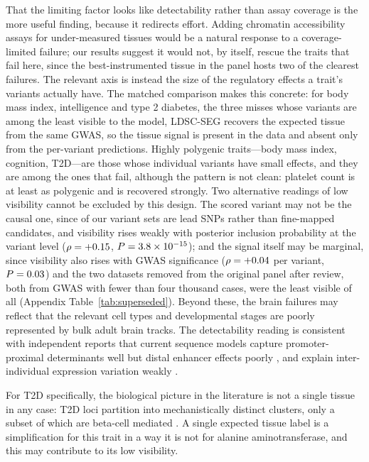 \documentclass[11pt]{article}
\begin{document}
That the limiting factor looks like detectability rather than assay coverage is the more
useful finding, because it redirects effort. Adding chromatin accessibility assays for
under-measured tissues would be a natural response to a coverage-limited failure; our
results suggest it would not, by itself, rescue the traits that fail here, since the
best-instrumented tissue in the panel hosts two of the clearest failures. The relevant
axis is instead the size of the regulatory effects a trait's variants actually have. The
matched comparison makes this concrete: for body mass index, intelligence and type 2
diabetes, the three misses whose variants are among the least visible to the model,
LDSC-SEG recovers the expected tissue from the same GWAS, so the tissue signal is present
in the data and absent only from the per-variant predictions.
Highly polygenic traits---body mass index, cognition, T2D---are those whose individual
variants have small effects, and they are among the ones that fail, although the pattern
is not clean: platelet count is at least as polygenic and is recovered strongly. Two
alternative readings of low visibility cannot be excluded by this design. The scored
variant may not be the causal one, since \NPICSTOP{} of our \NTRAITS{} variant sets are
lead SNPs rather than fine-mapped candidates, and visibility rises weakly with posterior
inclusion probability at the variant level ($\rho = +0.15$, $P = 3.8\times 10^{-15}$); and the
signal itself may be marginal, since visibility also rises with GWAS significance
($\rho = +0.04$ per variant, $P = 0.03$) and the two datasets removed from the original panel after review, both from GWAS
with fewer than four thousand cases, were the least visible of all (Appendix
Table~\ref{tab:superseded}). Beyond these, the brain failures may
reflect that the relevant cell types and developmental stages are poorly represented by
bulk adult brain tracks. The detectability reading is consistent with independent reports
that current sequence models capture promoter-proximal determinants well but distal
enhancer effects poorly \citep{karollus2023promoters}, and explain inter-individual
expression variation weakly \citep{sasse2023benchmark, huang2023personal}.

For T2D specifically, the biological picture in the literature is not a single tissue
in any case: T2D loci partition into mechanistically distinct clusters, only a subset of
which are beta-cell mediated \citep{udler2018clusters, lotta2017ir}. A single expected
tissue label is a simplification for this trait in a way it is not for alanine
aminotransferase, and this may contribute to its low visibility.
\end{document}
